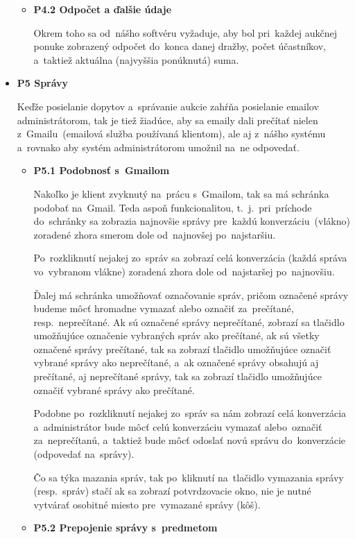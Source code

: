 \begin{itemize}
\begin{itemize}
\item \textbf{P4.2 Odpočet a ďalšie údaje}

Okrem toho sa od~nášho softvéru vyžaduje, aby bol pri~každej aukčnej ponuke zobrazený odpočet do~konca danej dražby, počet účastníkov, a~taktiež aktuálna (najvyššia ponúknutá) suma.
\end{itemize}

\item \textbf{P5 Správy}

Keďže posielanie dopytov a~správanie aukcie zahŕňa posielanie emailov administrátorom, tak je tiež žiadúce, aby sa emaily dali prečítať nielen z~Gmailu~(emailová služba používaná klientom), ale aj z~nášho systému a~rovnako aby systém administrátorom umožnil na~ne odpovedať.

\begin{itemize}
\item \textbf{P5.1 Podobnosť s~Gmailom}

Nakoľko je klient zvyknutý na~prácu s~Gmailom, tak sa má schránka podobať na~Gmail. Teda aspoň funkcionalitou, t.~j.~pri~príchode do~schránky sa zobrazia najnovšie správy pre~každú konverzáciu~(vlákno) zoradené zhora smerom dole od~najnovšej po~najstaršiu.

Po~rozkliknutí nejakej zo~správ sa zobrazí celá konverzácia (každá správa vo~vybranom vlákne) zoradená zhora dole od~najstaršej po~najnovšiu.

Ďalej má schránka umožňovať označovanie správ, pričom označené správy budeme môcť hromadne vymazať alebo označiť za~prečítané, resp.~neprečítané. Ak sú označené správy neprečítané, zobrazí sa tlačidlo umožňujúce označenie vybraných správ ako prečítané, ak sú všetky označené správy prečítané, tak sa zobrazí tlačidlo umožňujúce označiť vybrané správy ako neprečítané, a~ak označené správy obsahujú aj prečítané, aj neprečítané správy, tak sa zobrazí tlačidlo umožňujúce označiť vybrané správy ako prečítané.

Podobne po~rozkliknutí nejakej zo~správ sa nám zobrazí celá konverzácia a~administrátor bude môcť celú konverzáciu vymazať alebo~označiť za~neprečítanú, a~taktiež bude môcť odoslať novú správu do~konverzácie (odpovedať na~správy). 

Čo sa týka mazania správ, tak po~kliknutí na~tlačidlo vymazania správy (resp.~správ) stačí ak sa zobrazí potvrdzovacie okno, nie je nutné vytvárať osobitné miesto pre~vymazané správy (kôš). 

\item \textbf{P5.2 Prepojenie správy s~predmetom}


\end{itemize}
\end{itemize}
